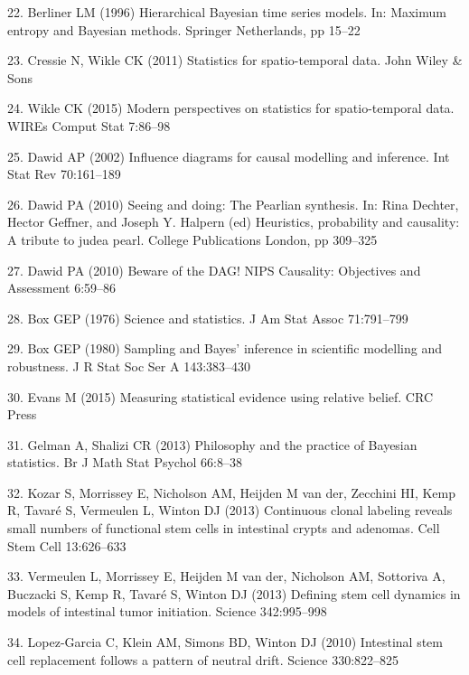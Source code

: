 \documentclass[10pt,letterpaper]{article}
\begin{document}
\hypertarget{ref-Berliner1996-xr}{}
22. Berliner LM (1996) Hierarchical Bayesian time series models. In:
Maximum entropy and Bayesian methods. Springer Netherlands, pp 15--22

\hypertarget{ref-Cressie2011-sw}{}
23. Cressie N, Wikle CK (2011) Statistics for spatio-temporal data. John
Wiley \& Sons

\hypertarget{ref-Wikle2015-jq}{}
24. Wikle CK (2015) Modern perspectives on statistics for
spatio-temporal data. WIREs Comput Stat 7:86--98

\hypertarget{ref-Dawid2002-ry}{}
25. Dawid AP (2002) Influence diagrams for causal modelling and
inference. Int Stat Rev 70:161--189

\hypertarget{ref-Dawid2010-ab}{}
26. Dawid PA (2010) Seeing and doing: The Pearlian synthesis. In: Rina
Dechter, Hector Geffner, and Joseph Y. Halpern (ed) Heuristics,
probability and causality: A tribute to judea pearl. College
Publications London, pp 309--325

\hypertarget{ref-Dawid2010-yg}{}
27. Dawid PA (2010) Beware of the DAG! NIPS Causality: Objectives and
Assessment 6:59--86

\hypertarget{ref-Box1976-he}{}
28. Box GEP (1976) Science and statistics. J Am Stat Assoc 71:791--799

\hypertarget{ref-Box1980-ch}{}
29. Box GEP (1980) Sampling and Bayes' inference in scientific modelling
and robustness. J R Stat Soc Ser A 143:383--430

\hypertarget{ref-Evans2015-kg}{}
30. Evans M (2015) Measuring statistical evidence using relative belief.
CRC Press

\hypertarget{ref-Gelman2013-wc}{}
31. Gelman A, Shalizi CR (2013) Philosophy and the practice of Bayesian
statistics. Br J Math Stat Psychol 66:8--38

\hypertarget{ref-Kozar2013-mr}{}
32. Kozar S, Morrissey E, Nicholson AM, Heijden M van der, Zecchini HI,
Kemp R, Tavaré S, Vermeulen L, Winton DJ (2013) Continuous clonal
labeling reveals small numbers of functional stem cells in intestinal
crypts and adenomas. Cell Stem Cell 13:626--633

\hypertarget{ref-Vermeulen2013-ew}{}
33. Vermeulen L, Morrissey E, Heijden M van der, Nicholson AM, Sottoriva
A, Buczacki S, Kemp R, Tavaré S, Winton DJ (2013) Defining stem cell
dynamics in models of intestinal tumor initiation. Science 342:995--998

\hypertarget{ref-Lopez-Garcia2010-bv}{}
34. Lopez-Garcia C, Klein AM, Simons BD, Winton DJ (2010) Intestinal
stem cell replacement follows a pattern of neutral drift. Science
330:822--825
\end{document}
